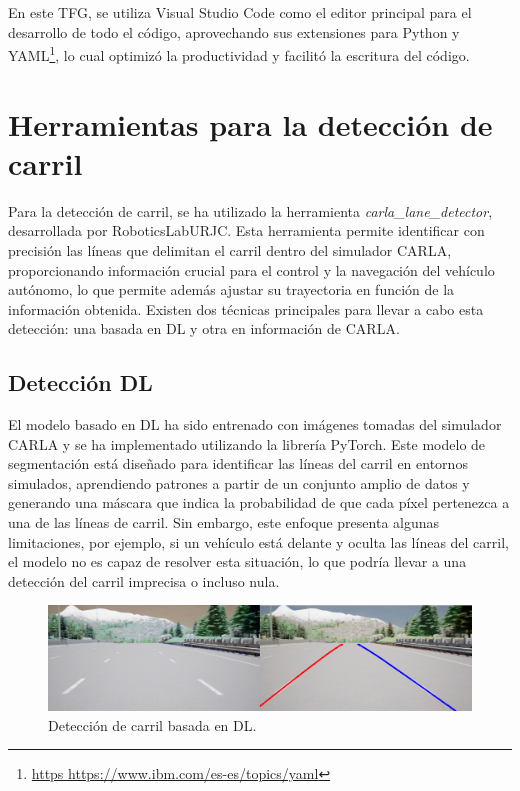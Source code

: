 \newpage

En este \ac{TFG}, se utiliza Visual Studio Code como el editor principal para el desarrollo de todo el código, aprovechando sus extensiones para Python y YAML\footnote{\url{https https://www.ibm.com/es-es/topics/yaml}}, lo cual optimizó la productividad y facilitó la escritura del código.

\section{Herramientas para la detección de carril}
\label{sec:herramientas_carril}

Para la detección de carril, se ha utilizado la herramienta \textit{carla\_lane\_detector}, desarrollada por RoboticsLabURJC. Esta herramienta permite identificar con precisión las líneas que delimitan el carril dentro del simulador CARLA, proporcionando información crucial para el control y la navegación del vehículo autónomo, lo que permite además ajustar su trayectoria en función de la información obtenida. Existen dos técnicas principales para llevar a cabo esta detección: una basada en \ac{DL} y otra en información de CARLA.

\subsection{Detección \ac{DL}}
\label{sec:carril_dl3}

El modelo basado en \ac{DL} ha sido entrenado con imágenes tomadas del simulador CARLA y se ha implementado utilizando la librería PyTorch. Este modelo de segmentación está diseñado para identificar las líneas del carril en entornos simulados, aprendiendo patrones a partir de un conjunto amplio de datos y generando una máscara que indica la probabilidad de que cada píxel pertenezca a una de las líneas de carril. Sin embargo, este enfoque presenta algunas limitaciones, por ejemplo, si un vehículo está delante y oculta las líneas del carril, el modelo no es capaz de resolver esta situación, lo que podría llevar a una detección del carril imprecisa o incluso nula.

\begin{figure}[ht]
  \begin{center}
    \includegraphics[width=13cm]{figs/Plataformas_Desarollo/carla_lane_dl.png}
  \end{center}
  \caption{Detección de carril basada en \ac{DL}.}
  \label{dl_lane}
\end{figure}

